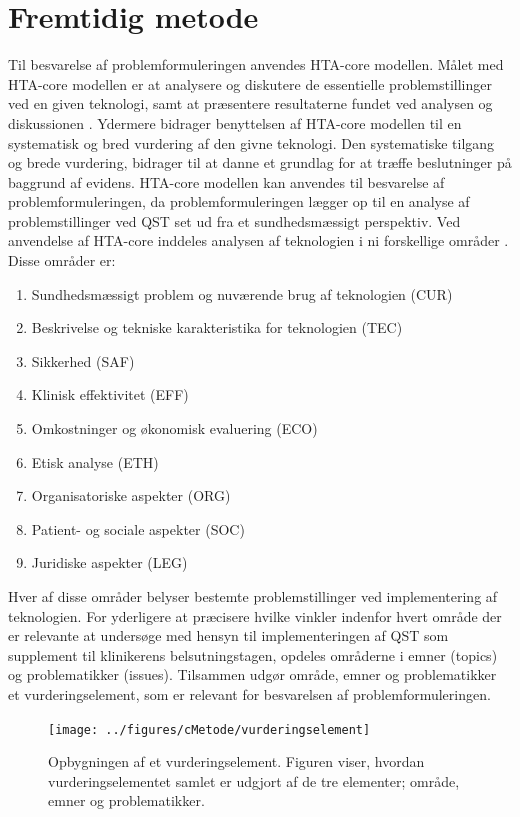 \chapter{Fremtidig metode}
Til besvarelse af problemformuleringen anvendes HTA-core modellen. Målet med HTA-core modellen er at analysere og diskutere de essentielle problemstillinger ved en given teknologi, samt at præsentere resultaterne fundet ved analysen og diskussionen \citep{HTAcore}. Ydermere bidrager benyttelsen af HTA-core modellen til en systematisk og bred vurdering af den givne teknologi. Den systematiske tilgang og brede vurdering‚ bidrager til  at danne et grundlag for at træffe beslutninger på baggrund af evidens. \citep{mtvhaandbog2007} \citep{HTAcore}  HTA-core modellen kan anvendes til besvarelse af problemformuleringen, da problemformuleringen lægger op til en analyse af problemstillinger ved QST set ud fra et sundhedsmæssigt perspektiv. Ved anvendelse af HTA-core inddeles analysen af teknologien i ni forskellige områder \citep{HTAcore}. Disse områder er: 

\begin{enumerate}
	\item Sundhedsmæssigt problem og nuværende brug af teknologien (CUR)
	\item Beskrivelse og tekniske karakteristika for teknologien (TEC)
	\item Sikkerhed (SAF)
	\item Klinisk effektivitet (EFF)
	\item Omkostninger og økonomisk evaluering (ECO)
	\item Etisk analyse (ETH)
	\item Organisatoriske aspekter (ORG)
	\item Patient- og sociale aspekter (SOC)
	\item Juridiske aspekter (LEG)
\end{enumerate}

Hver af disse områder belyser bestemte problemstillinger ved implementering af teknologien. For yderligere at præcisere hvilke vinkler indenfor hvert område der er relevante at undersøge med hensyn til implementeringen af QST som supplement til klinikerens belsutningstagen, opdeles områderne i emner (topics) og problematikker (issues). Tilsammen udgør område, emner og problematikker et vurderingselement, som er relevant for besvarelsen af problemformuleringen.

\begin{figure}[H] 
	\begin{center}
		\texttt{[image: ../figures/cMetode/vurderingselement]}
	\end{center}
	\caption{Opbygningen af et vurderingselement. Figuren viser, hvordan vurderingselementet samlet er udgjort af de tre elementer; område, emner og problematikker.} 
	\label{fig:vurderingselement} 
\end{figure} \vspace{-.50cm}

